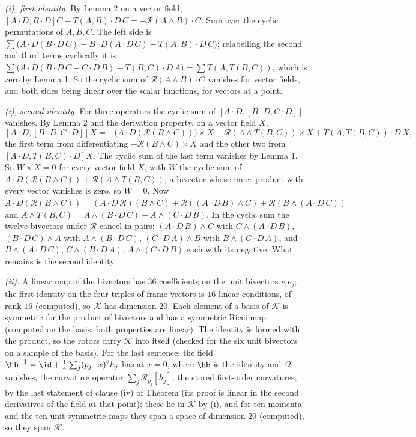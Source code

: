 \emph{(i), first identity.} By Lemma 2 on a vector field, $[A \cdot D, B \cdot D]C - T(A, B) \cdot D\,C = -\mathcal{R}(A \wedge B) \cdot C$. Sum over the cyclic permutations of $A, B, C$. The left side is $\sum\bigl(A \cdot D(B \cdot D\,C) - B \cdot D(A \cdot D\,C) - T(A, B) \cdot D\,C\bigr)$; relabelling the second and third terms cyclically it is $\sum\bigl(A \cdot D(B \cdot D\,C - C \cdot D\,B) - T(B, C) \cdot D\,A\bigr) = \sum T(A, T(B, C))$, which is zero by Lemma 1. So the cyclic sum of $\mathcal{R}(A \wedge B) \cdot C$ vanishes for vector fields, and both sides being linear over the scalar functions, for vectors at a point.

\emph{(i), second identity.} For three operators the cyclic sum of $[A \cdot D, [B \cdot D, C \cdot D]]$ vanishes. By Lemma 2 and the derivation property, on a vector field $X$,
\[
[A \cdot D, [B \cdot D, C \cdot D]]X = -\bigl(A \cdot D(\mathcal{R}(B \wedge C))\bigr) \times X - \mathcal{R}(A \wedge T(B, C)) \times X + T(A, T(B, C)) \cdot D\,X ,
\]
the first term from differentiating $-\mathcal{R}(B \wedge C) \times X$ and the other two from $[A \cdot D, T(B, C) \cdot D]X$. The cyclic sum of the last term vanishes by Lemma 1. So $W \times X = 0$ for every vector field $X$, with $W$ the cyclic sum of $A \cdot D(\mathcal{R}(B \wedge C)) + \mathcal{R}(A \wedge T(B, C))$; a bivector whose inner product with every vector vanishes is zero, so $W = 0$. Now $A \cdot D(\mathcal{R}(B \wedge C)) = (A \cdot D\,\mathcal{R})(B \wedge C) + \mathcal{R}((A \cdot D\,B) \wedge C) + \mathcal{R}(B \wedge (A \cdot D\,C))$ and $A \wedge T(B, C) = A \wedge (B \cdot D\,C) - A \wedge (C \cdot D\,B)$. In the cyclic sum the twelve bivectors under $\mathcal{R}$ cancel in pairs: $(A \cdot D\,B) \wedge C$ with $C \wedge (A \cdot D\,B)$, $(B \cdot D\,C) \wedge A$ with $A \wedge (B \cdot D\,C)$, $(C \cdot D\,A) \wedge B$ with $B \wedge (C \cdot D\,A)$, and $B \wedge (A \cdot D\,C)$, $C \wedge (B \cdot D\,A)$, $A \wedge (C \cdot D\,B)$ each with its negative. What remains is the second identity.

\emph{(ii).} A linear map of the bivectors has $36$ coefficients on the unit bivectors $e_{i}e_{j}$; the first identity on the four triples of frame vectors is $16$ linear conditions, of rank $16$ (computed), so $\mathcal{K}$ has dimension $20$. Each element of a basis of $\mathcal{K}$ is symmetric for the product of bivectors and has a symmetric Ricci map (computed on the basis; both properties are linear). The identity is formed with the product, so the rotors carry $\mathcal{K}$ into itself (checked for the six unit bivectors on a sample of the basis). For the last sentence: the field $\hb^{-1} = \id + \tfrac14\sum_{j}(p_{j} \cdot x)^{2}h_{j}$ has at $x = 0$, where $\hb$ is the identity and $\Omega$ vanishes, the curvature operator $\sum_{j}\mathcal{R}_{p_{j}}[h_{j}]$, the stored first-order curvatures, by the last statement of clause (iv) of Theorem  (its proof is linear in the second derivatives of the field at that point); these lie in $\mathcal{K}$ by (i), and for ten momenta and the ten unit symmetric maps they span a space of dimension $20$ (computed), so they span $\mathcal{K}$.

